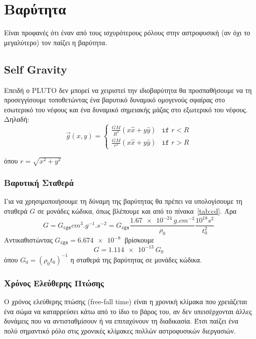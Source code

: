 	\newpage
	\section{Βαρύτητα}
	Είναι προφανές ότι έναν από τους ισχυρότερους ρόλους στην αστροφυσική (αν όχι το μεγαλύτερο) τον παίζει η βαρύτητα. 
	
	\subsection{Self Gravity}
	\label{par:SolidSphereSelfGravit}
	Επειδή ο PLUTO δεν μπορεί να χειριστεί την ιδιοβαρύτητα θα προσπαθήσουμε να τη προσεγγίσουμε τοποθετώντας ένα βαρυτικό δυναμικό ομογενούς σφαίρας στο εσωτερικό του νέφους και ένα δυναμικό σημειακής μάζας στο εξωτερικό του νέφους. Δηλαδή:
	\begin{equation}
		\vec{g}(x,y) = 
		\begin{cases}
			\frac{GM}{R^3}(x \hat{x}+ y \hat{y}) &\texttt{if } r<R \\
			\frac{GM}{r^3}(x \hat{x}+ y \hat{y}) &\texttt{if } r>R
		\end{cases}
	\end{equation}
	
	όπου $r=\sqrt{x^2+y^2}$
	
	\subsubsection{Βαρυτική Σταθερά}
	Για να χρησιμοποιήσουμε τη δύναμη της βαρύτητας θα πρέπει να υπολογίσουμε τη σταθερά $G$ σε μονάδες κώδικα, όπως βλέπουμε και από το πίνακα~\ref{tab:cd}. Άρα 
	\begin{equation}
		G=G_\texttt{cgs} \si{cm^3.g^{-1}.s^{-2}} = G_\texttt{cgs} \frac{\SI{1.67e-24}{g.cm^{-3}}}{\rho_0}\frac{10^{18}\si{s^2}}{t^2_0}
	\end{equation}
	Αντικαθιστώντας $G_\texttt{cgs}=\SI{6.674e-8}{}$ βρίσκουμε
	\begin{equation}
		\boxed{G=\SI{1.114e-13}{G_0}}
	\end{equation}
	όπου $G_0=(\rho_0 t_0)^{-1}$ η σταθερά της βαρύτητας σε μονάδες κώδικα.
	
	
	\subsubsection{Χρόνος Ελεύθερης Πτώσης}
	Ο χρόνος ελεύθερης πτώσης (free-fall time) είναι η χρονική κλίμακα που χρειάζεται ένα σώμα να καταρρεύσει κάτω από το ίδιο το βάρος του, αν δεν υπεισέρχονται άλλες δυνάμεις που να αντισταθμίσουν ή να επιταχύνουν τη διαδικασία. Έτσι παίζει ένα πολύ σημαντικό ρόλο στις χρονικές κλίμακες πολλών αστροφυσικών διεργασιών.
	
